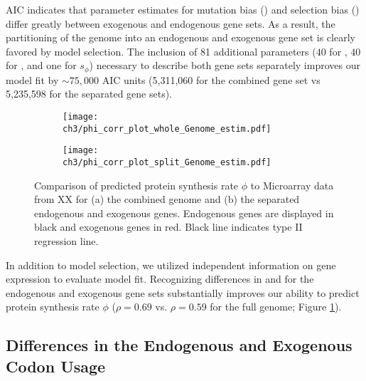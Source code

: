 AIC indicates that parameter estimates for mutation bias (\DM) and selection bias (\DE) differ greatly between exogenous and endogenous gene sets.
As a result, the partitioning of the \kluyveri genome into an endogenous and exogenous gene set is clearly favored by model selection.
The inclusion of 81 additional parameters ($40$ for \DM, $40$ for \DE, and one for $s_{\phi}$) necessary to describe both gene sets separately improves our model fit by $\sim 75,000$ AIC units (5,311,060 for the combined gene set vs 5,235,598 for the separated gene sets).

\begin{figure}[t]
    \centering
    \begin{subfigure}
        \centering
        \texttt{[image: ch3/phi\_corr\_plot\_whole\_Genome\_estim.pdf]}
    \end{subfigure}
    \begin{subfigure}
        \centering
        \texttt{[image: ch3/phi\_corr\_plot\_split\_Genome\_estim.pdf]}
    \end{subfigure}
    \caption{Comparison of predicted protein synthesis rate $\phi$ to Microarray data from XX for (a) the combined genome and (b) the separated endogenous and exogenous genes. Endogenous genes are displayed in black and exogenous genes in red. Black line indicates type II regression line.}
    \label{fig:phi_corr_two_cond}
\end{figure}

In addition to model selection, we utilized independent information on gene expression to evaluate model fit.
Recognizing differences in \DM and \DE for the endogenous and exogenous gene sets substantially improves our ability to predict protein synthesis rate $\phi$ ($\rho = 0.69$ vs. $\rho = 0.59$ for the full genome;  Figure \ref{fig:phi_corr_two_cond}).

\subsection{Differences in the Endogenous and Exogenous Codon Usage}

